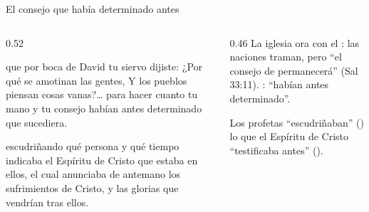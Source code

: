 \begin{frame}{El consejo que había determinado antes}
\begin{columns}[t,onlytextwidth]
\begin{column}{0.52\textwidth}
\begin{cita}que por boca de David tu siervo dijiste: ¿Por qué se amotinan las gentes, Y los pueblos piensan cosas vanas?\ldots{} para hacer cuanto tu mano y tu consejo habían antes determinado que sucediera.\end{cita}
\begin{cita}escudriñando qué persona y qué tiempo indicaba el Espíritu de Cristo que estaba en ellos, el cual anunciaba de antemano los sufrimientos de Cristo, y las glorias que vendrían tras ellos.\end{cita}
\end{column}
\begin{column}{0.46\textwidth}\small
La iglesia ora con el : las naciones traman, pero ``el consejo de \SENOR{} permanecerá'' (Sal 33:11). : ``habían antes determinado''.\par\medskip
Los profetas ``escudriñaban'' () lo que el Espíritu de Cristo ``testificaba antes'' ().\par\medskip
{}
\end{column}
\end{columns}
\end{frame}

